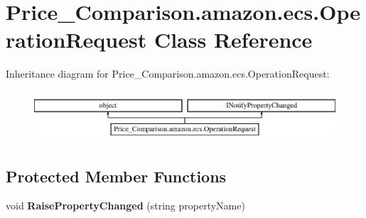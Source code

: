 \hypertarget{class_price___comparison_1_1amazon_1_1ecs_1_1_operation_request}{\section{Price\-\_\-\-Comparison.\-amazon.\-ecs.\-Operation\-Request Class Reference}
\label{class_price___comparison_1_1amazon_1_1ecs_1_1_operation_request}
}


 


Inheritance diagram for Price\-\_\-\-Comparison.\-amazon.\-ecs.\-Operation\-Request\-:\begin{figure}[H]
\begin{center}
\leavevmode
\includegraphics[height=1.872910cm]{class_price___comparison_1_1amazon_1_1ecs_1_1_operation_request}
\end{center}
\end{figure}
\subsection*{Protected Member Functions}
\begin{DoxyCompactItemize}
\item 
\hypertarget{class_price___comparison_1_1amazon_1_1ecs_1_1_operation_request_a35f5b78306c349fddf29cceb5c0dac06}{void {\bfseries Raise\-Property\-Changed} (string property\-Name)}\label{class_price___comparison_1_1amazon_1_1ecs_1_1_operation_request_a35f5b78306c349fddf29cceb5c0dac06}

\end{DoxyCompactItemize}
